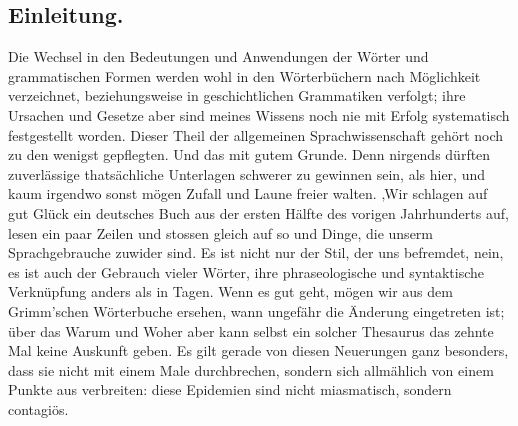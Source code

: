 {\subsection*{Einleitung.}
Die Wechsel in den Bedeutungen und Anwendungen der Wörter und grammatischen Formen werden wohl in den Wörterbüchern nach Möglichkeit verzeichnet, beziehungsweise in geschichtlichen Grammatiken verfolgt; ihre Ursachen und Gesetze aber sind meines Wissens noch nie mit Erfolg systematisch festgestellt worden. Dieser Theil der allgemeinen \label{fp.226} Sprachwissenschaft gehört noch zu den wenigst gepflegten. Und das mit gutem Grunde. Denn nirgends dürften zuverlässige thatsächliche Unterlagen schwerer zu gewinnen sein, als hier, und kaum irgendwo sonst mögen Zufall und Laune freier walten. ‚Wir schlagen auf gut Glück ein deutsches Buch aus der ersten Hälfte des vorigen Jahrhunderts \label{sp.228} auf, lesen ein paar Zeilen und stossen gleich auf so und  Dinge, die unserm Sprachgebrauche zuwider sind. Es ist nicht nur der Stil, der uns befremdet, nein, es ist auch der Gebrauch vieler Wörter, ihre phraseologische und syntaktische Verknüpfung anders als in  Tagen. Wenn es gut geht, mögen wir aus dem Grimm’schen Wörterbuche ersehen, wann ungefähr die Änderung eingetreten ist; über das Warum und Woher aber kann selbst ein solcher Thesaurus das zehnte Mal keine Auskunft geben. Es gilt gerade von diesen Neuerungen ganz besonders, dass sie nicht mit einem Male durchbrechen, sondern sich allmählich von einem Punkte aus verbreiten: diese Epidemien sind nicht miasmatisch, sondern contagiös.

\begin{sloppypar}\end{sloppypar}

}
